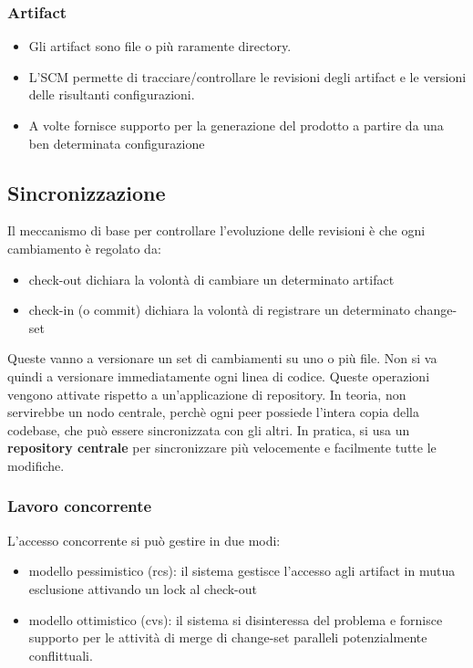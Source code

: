 \subsubsection{Artifact}

\begin{itemize}
    \item Gli artifact sono file o più raramente directory. 
    \item L’SCM permette di tracciare/controllare le revisioni degli artifact e le versioni delle risultanti configurazioni. 
    \item A volte fornisce supporto per la generazione del prodotto a partire da una ben determinata configurazione
\end{itemize}

\subsection{Sincronizzazione}

Il meccanismo di base per controllare l'evoluzione delle revisioni è che ogni cambiamento è regolato da:
\begin{itemize}
    \item check-out dichiara la volontà di cambiare un determinato artifact
    \item check-in (o commit) dichiara la volontà di registrare un determinato change-set
\end{itemize}
Queste vanno a versionare un set di cambiamenti su uno o più file. Non si va quindi a versionare immediatamente ogni linea di codice. Queste operazioni vengono attivate rispetto a un'applicazione di repository. In teoria, non servirebbe un nodo centrale, perchè ogni peer possiede l'intera copia della codebase, che può essere sincronizzata con gli altri. In pratica, si usa un \textbf{repository centrale} per sincronizzare più velocemente e facilmente tutte le modifiche.

\subsubsection{Lavoro concorrente}

L'accesso concorrente si può gestire in due modi:
\begin{itemize}
\item modello pessimistico (rcs): il sistema gestisce l'accesso agli artifact in mutua esclusione attivando un lock al check-out
\item modello ottimistico (cvs): il sistema si disinteressa del problema e fornisce supporto per le attività di merge di change-set paralleli potenzialmente conflittuali.
\end{itemize}

